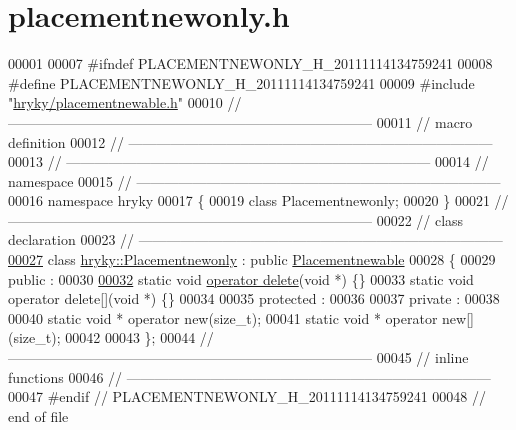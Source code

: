 \hypertarget{placementnewonly_8h_source}{\section{placementnewonly.\-h}
}

\begin{DoxyCode}
00001 
00007 \textcolor{preprocessor}{#ifndef PLACEMENTNEWONLY\_H\_20111114134759241}
00008 \textcolor{preprocessor}{}\textcolor{preprocessor}{#define PLACEMENTNEWONLY\_H\_20111114134759241}
00009 \textcolor{preprocessor}{}\textcolor{preprocessor}{#include "\hyperlink{placementnewable_8h}{hryky/placementnewable.h}"}
00010 \textcolor{comment}{//
      ------------------------------------------------------------------------------}
00011 \textcolor{comment}{// macro definition}
00012 \textcolor{comment}{//
      ------------------------------------------------------------------------------}
00013 \textcolor{comment}{//
      ------------------------------------------------------------------------------}
00014 \textcolor{comment}{// namespace}
00015 \textcolor{comment}{//
      ------------------------------------------------------------------------------}
00016 \textcolor{keyword}{namespace }hryky
00017 \{
00019     \textcolor{keyword}{class }Placementnewonly;
00020 \}
00021 \textcolor{comment}{//
      ------------------------------------------------------------------------------}
00022 \textcolor{comment}{// class declaration}
00023 \textcolor{comment}{//
      ------------------------------------------------------------------------------}
\hypertarget{placementnewonly_8h_source_l00027}{}\hyperlink{classhryky_1_1_placementnewonly}{00027} \textcolor{comment}{}\textcolor{keyword}{class }\hyperlink{classhryky_1_1_placementnewonly}{hryky::Placementnewonly} : \textcolor{keyword}{public} \hyperlink{classhryky_1_1_placementnewable}{Placementnewable}
00028 \{
00029 \textcolor{keyword}{public} :
00030 
\hypertarget{placementnewonly_8h_source_l00032}{}\hyperlink{classhryky_1_1_placementnewonly_a0f2889730fe6118b9da9cbc4189ac8d8}{00032}     \textcolor{keyword}{static} \textcolor{keywordtype}{void} \hyperlink{classhryky_1_1_placementnewonly_a0f2889730fe6118b9da9cbc4189ac8d8}{operator delete}(\textcolor{keywordtype}{void} *) \{\}
00033     \textcolor{keyword}{static} \textcolor{keywordtype}{void} operator delete[](\textcolor{keywordtype}{void} *) \{\}
00034 
00035 \textcolor{keyword}{protected} :
00036 
00037 \textcolor{keyword}{private} :
00038 
00040     \textcolor{keyword}{static} \textcolor{keywordtype}{void} * operator new(\textcolor{keywordtype}{size\_t});
00041     \textcolor{keyword}{static} \textcolor{keywordtype}{void} * operator new[](\textcolor{keywordtype}{size\_t});
00042 
00043 \};
00044 \textcolor{comment}{//
      ------------------------------------------------------------------------------}
00045 \textcolor{comment}{// inline functions}
00046 \textcolor{comment}{//
      ------------------------------------------------------------------------------}
00047 \textcolor{preprocessor}{#endif // PLACEMENTNEWONLY\_H\_20111114134759241}
00048 \textcolor{preprocessor}{}\textcolor{comment}{// end of file}
\end{DoxyCode}
